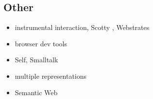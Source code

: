 \documentclass[sigplan,10pt,anonymous,review]{acmart}
\providecommand{\tightlist}{%
  \setlength{\itemsep}{0pt}\setlength{\parskip}{0pt}}
\begin{document}
\hypertarget{other}{%
\subsection{Other}\label{other}}

\begin{itemize}
\tightlist
\item
  instrumental interaction, Scotty \citep{eagan2011}, Webstrates
\item
  browser dev tools
\item
  Self, Smalltalk
\item
  multiple representations
\item
  Semantic Web
\end{itemize}



\end{document}
